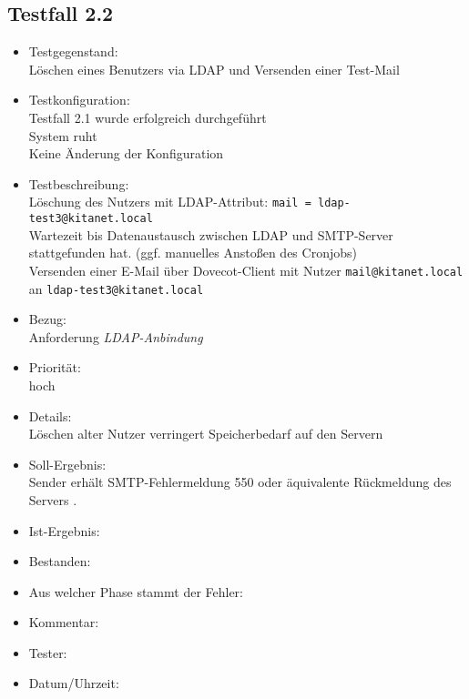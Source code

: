 \subsection{Testfall 2.2}
\begin{itemize}
	\item Testgegenstand:\\
Löschen eines Benutzers via LDAP und Versenden einer Test-Mail
	\item Testkonfiguration:\\
	Testfall 2.1 wurde erfolgreich durchgeführt\\
	System ruht\\
	Keine Änderung der Konfiguration
	\item Testbeschreibung:\\
	Löschung des Nutzers mit LDAP-Attribut: \verb+mail = ldap-test3@kitanet.local+\\
	Wartezeit bis Datenaustausch zwischen LDAP und SMTP-Server stattgefunden hat. (ggf. manuelles Anstoßen des Cronjobs)\\
	Versenden einer E-Mail über Dovecot-Client mit Nutzer \verb+mail@kitanet.local+ \\ an \verb+ldap-test3@kitanet.local+
	\item Bezug:\\
	Anforderung \textit{LDAP-Anbindung}
	\item Priorität:\\
	hoch
	\item Details:\\
	Löschen alter Nutzer verringert Speicherbedarf auf den Servern
	\item Soll-Ergebnis:\\
	Sender erhält SMTP-Fehlermeldung 550 oder äquivalente Rückmeldung des Servers \citep[vgl.][16]{rfc821}.
	\item Ist-Ergebnis:\\
	\item Bestanden:\\
	\item Aus welcher Phase stammt der Fehler:\\
	\item Kommentar:\\
	\item Tester:\\
	\item Datum/Uhrzeit:\\
\end{itemize}



